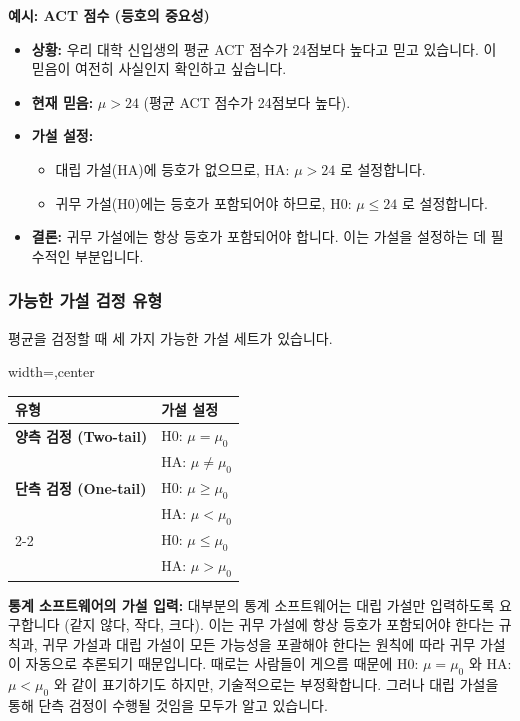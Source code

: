 \documentclass[11pt,a4paper]{article}
\theoremstyle{definition}
\begin{document}
\begin{examplebox}
\textbf{예시: ACT 점수 (등호의 중요성)}
\begin{itemize}
    \item \textbf{상황:} 우리 대학 신입생의 평균 ACT 점수가 24점보다 높다고 믿고 있습니다. 이 믿음이 여전히 사실인지 확인하고 싶습니다.
    \item \textbf{현재 믿음:} $\mu > 24$ (평균 ACT 점수가 24점보다 높다).
    \item \textbf{가설 설정:}
        \begin{itemize}
            \item 대립 가설(HA)에 등호가 없으므로, HA: $\mu > 24$ 로 설정합니다.
            \item 귀무 가설(H0)에는 등호가 포함되어야 하므로, H0: $\mu \le 24$ 로 설정합니다.
        \end{itemize}
    \item \textbf{결론:} 귀무 가설에는 항상 등호가 포함되어야 합니다. 이는 가설을 설정하는 데 필수적인 부분입니다.
\end{itemize}
\end{examplebox}

\subsubsection*{가능한 가설 검정 유형}

평균을 검정할 때 세 가지 가능한 가설 세트가 있습니다.

\begin{adjustbox}{width=\textwidth,center}
\begin{tabular}{ll}
\toprule
\textbf{유형} & \textbf{가설 설정} \\
\midrule
\textbf{양측 검정 (Two-tail)} & H0: $\mu = \mu_0$ \\
& HA: $\mu \ne \mu_0$ \\
\midrule
\textbf{단측 검정 (One-tail)} & H0: $\mu \ge \mu_0$ \\
& HA: $\mu < \mu_0$ \\
\cmidrule{2-2}
& H0: $\mu \le \mu_0$ \\
& HA: $\mu > \mu_0$ \\
\bottomrule
\end{tabular}
\end{adjustbox}
\label{tab:hypothesis_types}

\begin{cautionbox}
\textbf{통계 소프트웨어의 가설 입력:}
대부분의 통계 소프트웨어는 대립 가설만 입력하도록 요구합니다 (같지 않다, 작다, 크다).
이는 귀무 가설에 항상 등호가 포함되어야 한다는 규칙과, 귀무 가설과 대립 가설이 모든 가능성을 포괄해야 한다는 원칙에 따라 귀무 가설이 자동으로 추론되기 때문입니다.
때로는 사람들이 게으름 때문에 H0: $\mu = \mu_0$ 와 HA: $\mu < \mu_0$ 와 같이 표기하기도 하지만, 기술적으로는 부정확합니다. 그러나 대립 가설을 통해 단측 검정이 수행될 것임을 모두가 알고 있습니다.
\end{cautionbox}
\end{document}
